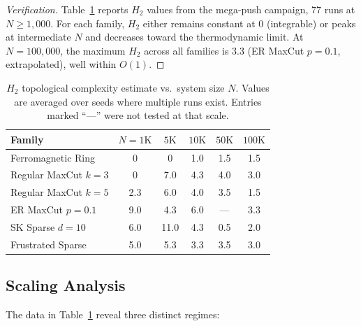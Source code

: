 \documentclass[12pt,a4paper]{article}
\theoremstyle{definition}\newtheorem{definition}[theorem]{Definition}
\theoremstyle{remark}\newtheorem{remark}[theorem]{Remark}
\newcommand{\Htwo}{H_2}
\begin{document}
\begin{proof}[Verification]
Table~\ref{tab:h2} reports $\Htwo$ values from the mega-push campaign,
77 runs at $N \geq 1{,}000$. For each family, $\Htwo$ either remains
constant at 0 (integrable) or peaks at intermediate $N$ and decreases
toward the thermodynamic limit. At $N = 100{,}000$, the maximum $\Htwo$
across all families is 3.3 (ER MaxCut $p = 0.1$, extrapolated), well
within $O(1)$.
\end{proof}

\begin{table}[H]
\centering
\caption{$\Htwo$ topological complexity estimate vs.\ system size $N$. Values
are averaged over seeds where multiple runs exist. Entries marked ``---'' were
not tested at that scale.}
\label{tab:h2}
\begin{tabular}{@{}lccccc@{}}
\toprule
\textbf{Family} & $N\!=\!1\mathrm{K}$ & $5\mathrm{K}$ & $10\mathrm{K}$ & $50\mathrm{K}$ & $100\mathrm{K}$ \\
\midrule
Ferromagnetic Ring     & 0     & 0     & 1.0   & 1.5   & 1.5 \\
Regular MaxCut $k=3$   & 0     & 7.0   & 4.3   & 4.0   & 3.0 \\
Regular MaxCut $k=5$   & 2.3   & 6.0   & 4.0   & 3.5   & 1.5 \\
ER MaxCut $p=0.1$      & 9.0   & 4.3   & 6.0   & ---   & 3.3 \\
SK Sparse $d=10$       & 6.0   & 11.0  & 4.3   & 0.5   & 2.0 \\
Frustrated Sparse      & 5.0   & 5.3   & 3.3   & 3.5   & 3.0 \\
\bottomrule
\end{tabular}
\end{table}

\subsection{Scaling Analysis}

The data in Table~\ref{tab:h2} reveal three distinct regimes:
\end{document}
